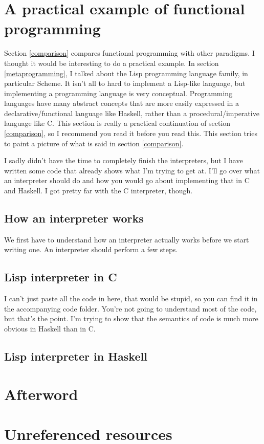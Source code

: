 \documentclass[11pt]{article}
\begin{document}
\section{A practical example of functional programming}

Section \ref{comparison} compares functional programming with other paradigms.
I thought it would be interesting to do a practical example. In section
\ref{metaprogramming}, I talked about the Lisp programming language family, in
particular Scheme. It isn't all to hard to implement a Lisp-like language, but
implementing a programming language is very conceptual. Programming languages
have many abstract concepts that are more easily expressed in a
declarative/functional language like Haskell, rather than a
procedural/imperative language like C. This section is really a practical
continuation of section \ref{comparison}, so I recommend you read it before you
read this. This section tries to paint a picture of what is said in section
\ref{comparison}.

I sadly didn't have the time to completely finish the interpreters, but I have
written some code that already shows what I'm trying to get at. I'll go over
what an interpreter should do and how you would go about implementing that in C
and Haskell. I got pretty far with the C interpreter, though.

\subsection{How an interpreter works}

We first have to understand how an interpreter actually works before we start
writing one. An interpreter should perform a few steps.

\subsection{Lisp interpreter in C}

I can't just paste all the code in here, that would be stupid, so you can find
it in the accompanying code folder. You're not going to understand most of the
code, but that's the point. I'm trying to show that the semantics of code is
much more obvious in Haskell than in C.

\subsection{Lisp interpreter in Haskell}

\newpage
\section*{Afterword}

\newpage
\section*{Unreferenced resources}


\newpage
\printbibliography[heading=bibintoc, title={References}]
\end{document}
